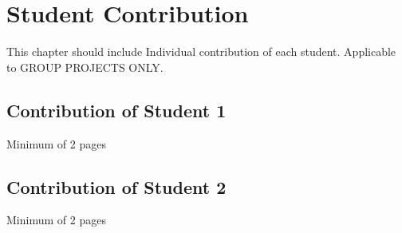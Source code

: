 \chapter{Student Contribution}  

This chapter should include Individual contribution of each student. Applicable to GROUP PROJECTS ONLY.

\section{Contribution of Student 1}

 Minimum of 2 pages

\section{Contribution of Student 2}

 Minimum of 2 pages

